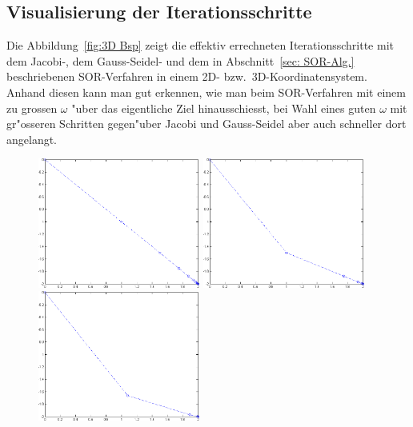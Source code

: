 \begin{refsection}
\subsection{Visualisierung der Iterationsschritte}
Die Abbildung~\ref{fig:3D Bsp} zeigt die effektiv errechneten
Iterationsschritte mit dem Jacobi-, dem Gauss-Seidel- und dem in
Abschnitt~\ref{sec: SOR-Alg.} beschriebenen SOR-Verfahren in einem 2D-
bzw.~3D-Koordinaten\-system.
Anhand diesen kann man gut erkennen, wie man beim SOR-Verfahren mit
einem zu grossen $\omega$ "uber das eigentliche Ziel hinausschiesst,
bei Wahl eines guten $\omega$ mit gr"osseren Schritten gegen"uber Jacobi
und Gauss-Seidel aber auch schneller dort angelangt.
\begin{figure}\centering
\includegraphics[width=0.475\textwidth]{sor/img/Jac_2D_14It.png}\hfill
\includegraphics[width=0.475\textwidth]{sor/img/G_S_2D_7It.png}\\[1mm]
\includegraphics[width=0.475\textwidth]{sor/img/SOR_2D_4_It_w_1_08.png}\hfill

\end{figure}
\end{refsection}
